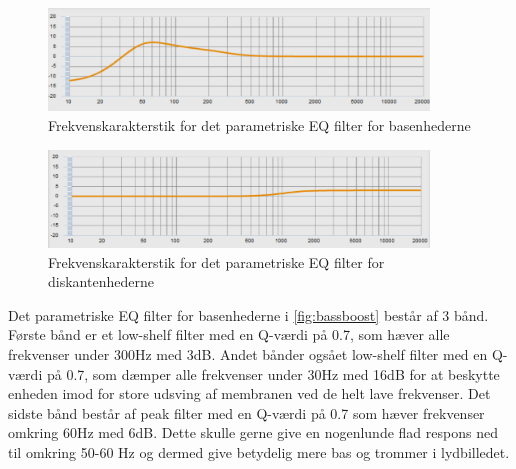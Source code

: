 \begin{figure}[H]
	\center
	\includegraphics[width=0.9\textwidth]{figur/bassboost}
	\caption{Frekvenskarakterstik for det parametriske EQ filter for basenhederne}
	\label{fig:bassboost}
\end{figure}

\begin{figure}[H]
	\center
	\includegraphics[width=0.9\textwidth]{figur/diskantboost}
	\caption{Frekvenskarakterstik for det parametriske EQ filter for diskantenhederne}
	\label{fig:diskantboost}
\end{figure}

Det parametriske EQ filter for basenhederne i \autoref{fig:bassboost} består af 3 bånd. Første bånd er et low-shelf filter med en Q-værdi på 0.7, som hæver alle frekvenser under 300Hz med 3dB. Andet bånder ogsået low-shelf filter med en Q-værdi på 0.7, som dæmper alle frekvenser under 30Hz med 16dB for at beskytte enheden imod for store udsving af membranen ved de helt lave frekvenser. Det sidste bånd består af peak filter med en Q-værdi på 0.7 som hæver frekvenser omkring 60Hz med 6dB. Dette skulle gerne give en nogenlunde flad respons ned til omkring 50-60 Hz og dermed give betydelig mere bas og trommer i lydbilledet. 

